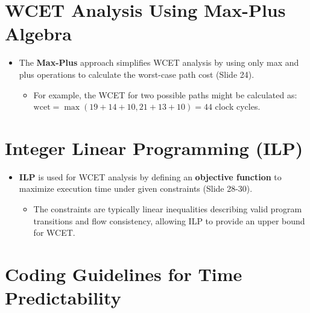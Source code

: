 \documentclass[
  14pt,
  a4paper,
  numbers=noendperiod,
  headinclude=true,
  footinclude=true,
  DIV=calc]{scrreprt}
\providecommand{\tightlist}{%
  \setlength{\itemsep}{0pt}\setlength{\parskip}{0pt}}\usepackage{longtable,booktabs,array}
\begin{document}
\section{WCET Analysis Using Max-Plus
Algebra}\label{wcet-analysis-using-max-plus-algebra}

\begin{itemize}
\item
  The \textbf{Max-Plus} approach simplifies WCET analysis by using only
  max and plus operations to calculate the worst-case path cost (Slide
  24).

  \begin{itemize}
  \tightlist
  \item
    For example, the WCET for two possible paths might be calculated as:
    \(\text{wcet} = \max(19 + 14 + 10, 21 + 13 + 10) = 44\) clock
    cycles.
  \end{itemize}
\end{itemize}

\section{Integer Linear Programming
(ILP)}\label{integer-linear-programming-ilp}

\begin{itemize}
\item
  \textbf{ILP} is used for WCET analysis by defining an
  \textbf{objective function} to maximize execution time under given
  constraints (Slide 28-30).

  \begin{itemize}
  \tightlist
  \item
    The constraints are typically linear inequalities describing valid
    program transitions and flow consistency, allowing ILP to provide an
    upper bound for WCET.
  \end{itemize}
\end{itemize}

\section{Coding Guidelines for Time
Predictability}\label{coding-guidelines-for-time-predictability}
\end{document}
